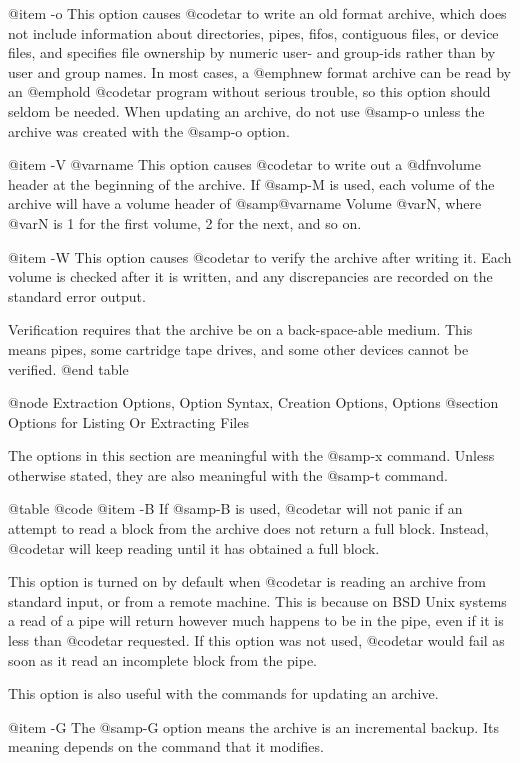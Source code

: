@item -o
This option causes @code{tar} to write an old format archive, which
does not include information about directories, pipes, fifos,
contiguous files, or device files, and specifies file ownership by
numeric user- and group-ids rather than by user and group names.  In
most cases, a @emph{new} format archive can be read by an @emph{old}
@code{tar} program without serious trouble, so this option should
seldom be needed.  When updating an archive, do not use @samp{-o}
unless the archive was created with the @samp{-o} option.

@item -V @var{name}
This option causes @code{tar} to write out a @dfn{volume header} at
the beginning of the archive.  If @samp{-M} is used, each volume of
the archive will have a volume header of @samp{@var{name} Volume @var{N}},
where @var{N} is 1 for the first volume, 2 for the next, and so on.

@item -W
This option causes @code{tar} to verify the archive after writing it.
Each volume is checked after it is written, and any discrepancies are
recorded on the standard error output.

Verification requires that the archive be on a back-space-able medium.
This means pipes, some cartridge tape drives, and some other devices
cannot be verified.
@end table

@node Extraction Options, Option Syntax, Creation Options, Options
@section Options for Listing Or Extracting Files

The options in this section are meaningful with the @samp{-x} command.
Unless otherwise stated, they are also meaningful with the @samp{-t}
command.

@table @code
@item -B
If @samp{-B} is used, @code{tar} will not panic if an attempt to
read a block from the archive does not return a full block.  Instead,
@code{tar} will keep reading until it has obtained a full block.

This option is turned on by default when @code{tar} is reading an
archive from standard input, or from a remote machine.  This is
because on BSD Unix systems a read of a pipe will return however much
happens to be in the pipe, even if it is less than @code{tar}
requested.  If this option was not used, @code{tar} would fail
as soon as it read an incomplete block from the pipe.

This option is also useful with the commands for updating an archive.

@item -G
The @samp{-G} option means the archive is an incremental backup.
Its meaning depends on the command that it modifies.

